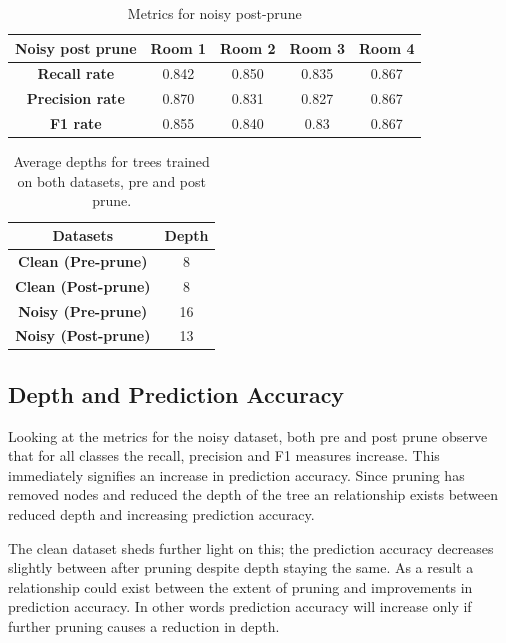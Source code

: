 \documentclass{article}
\begin{document}
\begin{table}[]
\begin{tabular}{|c|c|c|c|c|}
\hline
Noisy post prune        & \textbf{Room 1} & \textbf{Room 2} & \textbf{Room 3} & \textbf{Room 4} \\ \hline
\textbf{Recall rate}    & 0.842           & 0.850           & 0.835           & 0.867           \\ \hline
\textbf{Precision rate} & 0.870           & 0.831           & 0.827           & 0.867           \\ \hline
\textbf{F1 rate}        & 0.855           & 0.840            & 0.83          & 0.867           \\ \hline
\end{tabular}
\caption{Metrics for noisy post-prune}
\label{rmetrics_no_pop}
\end{table}


\begin{table}[]
\begin{tabular}{|c|c|}
\label{depths}

\textbf{Datasets}                    & \textbf{Depth} \\ \hline
\textbf{Clean (Pre-prune)}  & 8             \\ \hline
\textbf{Clean (Post-prune)} & 8             \\ \hline
\textbf{Noisy (Pre-prune)}  & 16             \\ \hline
\textbf{Noisy (Post-prune)}  & 13             \\ \hline
\end{tabular}
\caption{Average depths for trees trained on both datasets, pre and post prune.}
\end{table}

\subsection{Depth and Prediction Accuracy}

Looking at the metrics for the noisy dataset, both pre and post prune observe that for all classes the recall, precision and F1 measures increase. This immediately signifies an increase in prediction accuracy. Since pruning has removed nodes and reduced the depth of the tree an relationship exists between reduced depth and increasing prediction accuracy.

The clean dataset sheds further light on this; the prediction accuracy decreases slightly between after pruning despite depth staying the same. As a result a relationship could exist between the extent of pruning and improvements in prediction accuracy. In other words prediction accuracy will increase only if further pruning causes a reduction in depth.
\end{document}

